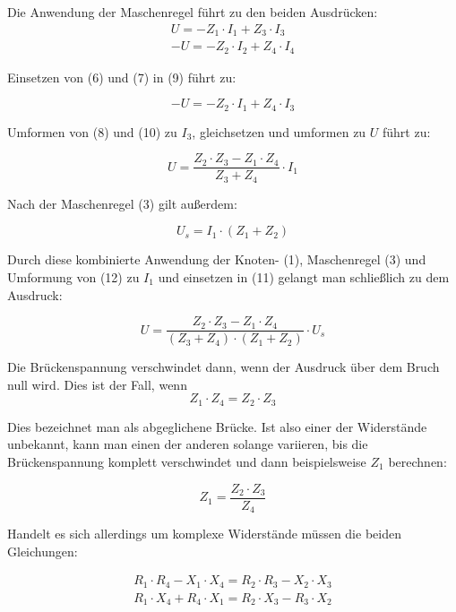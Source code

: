 Die Anwendung der Maschenregel führt zu den beiden Ausdrücken:
\begin{gather}
U = -Z_1\cdot I_1 + Z_3\cdot I_3 \\
-U = -Z_2\cdot I_2 + Z_4\cdot I_4
\end{gather}

Einsetzen von (6) und (7) in (9) führt zu:

\begin{equation}
-U = -Z_2\cdot I_1 + Z_4\cdot I_3
\end{equation}

Umformen von (8) und (10) zu $I_3$, gleichsetzen und umformen zu $U$ führt zu:

\begin{equation}
U = \frac{Z_2\cdot Z_3 - Z_1\cdot Z_4}{Z_3 + Z_4} \cdot I_1
\end{equation}

Nach der Maschenregel (3) gilt außerdem:

\begin{equation}
U_s = I_1\cdot (Z_1 + Z_2)
\end{equation}

Durch diese kombinierte Anwendung der Knoten- (1), Maschenregel (3)
und Umformung von (12) zu $I_1$ und einsetzen in (11) gelangt man 
schließlich zu dem Ausdruck: 

\begin{equation}
U = \frac{Z_2\cdot Z_3 - Z_1\cdot Z_4}{(Z_3 + Z_4)\cdot (Z_1 + Z_2)} \cdot U_s
\end{equation}

Die Brückenspannung verschwindet dann, wenn der Ausdruck über dem 
Bruch null wird. Dies ist der Fall, wenn
\begin{equation}
Z_1\cdot Z_4 = Z_2\cdot Z_3
\end{equation}

Dies bezeichnet man als abgeglichene Brücke. Ist also einer der 
Widerstände unbekannt, kann man einen der anderen solange variieren,
bis die Brückenspannung komplett verschwindet und dann beispielsweise 
$Z_1$ berechnen:

\begin{equation}
Z_1 = \frac{Z_2\cdot Z_3}{Z_4}
\end{equation}

Handelt es sich allerdings um komplexe Widerstände müssen
die beiden Gleichungen:

\begin{gather}
R_1\cdot R_4 - X_1\cdot X_4 = R_2\cdot R_3 - X_2\cdot X_3 \\
R_1\cdot X_4 + R_4\cdot X_1 = R_2\cdot X_3 - R_3\cdot X_2 
\end{gather}

